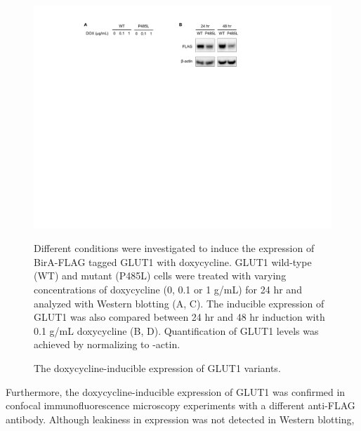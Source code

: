 \begin{figure}[h]
\centering
\includegraphics[scale=0.7]{Figures/WB}
\caption{The doxycycline-inducible expression of GLUT1 variants.}
\vspace*{-3mm}
\small \justify
Different conditions were investigated to induce the expression of BirA-FLAG tagged GLUT1 with doxycycline. GLUT1 wild-type (WT) and mutant (P485L) cells were treated with varying concentrations of doxycycline (0, 0.1 or 1 \textmu g/mL) for 24 hr and analyzed with Western blotting (A, C). The inducible expression of GLUT1 was also compared between 24 hr and 48 hr induction with 0.1 \textmu g/mL doxycycline (B, D). Quantification of GLUT1 levels was achieved by normalizing to \textbeta -actin.
\label{fig:wb}
\end{figure}
Furthermore, the doxycycline-inducible expression of GLUT1 was confirmed in confocal immunofluorescence microscopy experiments with a different anti-FLAG antibody. 
Although leakiness in expression was not detected in Western blotting, 

